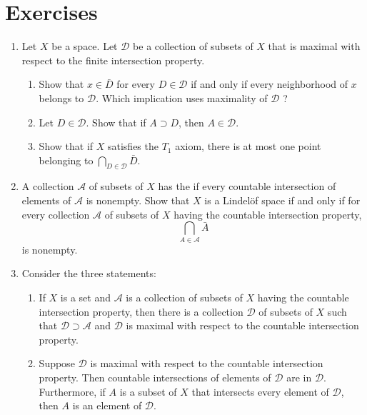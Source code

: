\section*{Exercises}
\begin{enumerate}[itemsep=0.4em, parsep=0pt, topsep=0pt, partopsep=0pt, leftmargin=*, label=\arabic*., ref=\arabic*]
\item Let \(X\) be a space. Let \(\mathcal{D}\) be a collection of subsets of \(X\) that is maximal with respect to the finite intersection property.
 \begin{enumerate}[itemsep=0.2em, parsep=0pt, topsep=0pt, partopsep=0pt, leftmargin=*, label=(\alph*), align=left]
 \item Show that \(x \in \bar{D}\) for every \(D \in \mathcal{D}\) if and only if every neighborhood of \(x\) belongs to \(\mathcal{D}\). Which implication uses maximality of \(\mathcal{D}\) ?
 \item Let \(D \in \mathcal{D}\). Show that if \(A \supset D\), then \(A \in \mathcal{D}\).
 \item Show that if \(X\) satisfies the \(T_{1}\) axiom, there is at most one point belonging to \(\mathop{\bigcap }\limits_{{D \in \mathcal{D}}}\bar{D}\).
 \end{enumerate}
\item A collection \(\mathcal{A}\) of subsets of \(X\) has the  if every countable intersection of elements of \(\mathcal{A}\) is nonempty. Show that \(X\) is a Lindelöf space if and only if for every collection \(\mathcal{A}\) of subsets of \(X\) having the countable intersection property,
\[
\mathop{\bigcap }\limits_{{A \in \mathcal{A}}}\bar{A}
\]
is nonempty.

\item Consider the three statements:

\begin{enumerate}[itemsep=0.2em, parsep=0pt, topsep=0pt, partopsep=0pt, leftmargin=*, label=(\roman*), align=left]
\item If \(X\) is a set and \(\mathcal{A}\) is a collection of subsets of \(X\) having the countable intersection property, then there is a collection \(\mathcal{D}\) of subsets of \(X\) such that \(\mathcal{D} \supset \mathcal{A}\) and \(\mathcal{D}\) is maximal with respect to the countable intersection property.

\item Suppose \(\mathcal{D}\) is maximal with respect to the countable intersection property. Then countable intersections of elements of \(\mathcal{D}\) are in \(\mathcal{D}\). Furthermore, if \(A\) is a subset of \(X\) that intersects every element of \(\mathcal{D}\), then \(A\) is an element of \(\mathcal{D}\).


\end{enumerate}
\end{enumerate}
